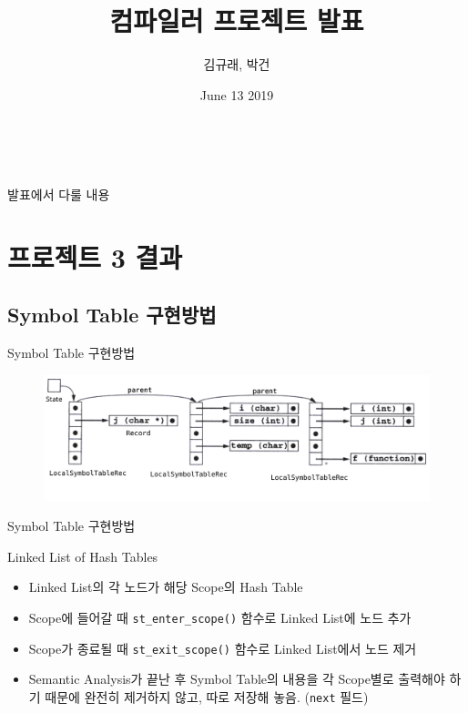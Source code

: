 \documentclass{bredelebeamer}
\title[Compiler Project]{컴파일러 프로젝트 발표}
\subtitle{}
\author{김규래, 박건}
\institute[Sogang University]
{
  서강대학교\\
}
\date{June 13 2019}
\def\code#1{\texttt{#1}}
\begin{document}
\begin{frame}
  \titlepage\
\end{frame}

\begin{frame}{발표에서 다룰 내용}
  \tableofcontents %
\end{frame}

\section{프로젝트 3 결과}
\subsection{Symbol Table 구현방법}
\begin{frame}{Symbol Table 구현방법}
	\begin{figure}
		\includegraphics[scale=0.3]{images/symtab.png}
	\end{figure}
\end{frame}

\begin{frame}{Symbol Table 구현방법}
	\begin{block}{Linked List of Hash Tables}
		\begin{itemize}
			\item Linked List의 각 노드가 해당 Scope의 Hash Table
			\item Scope에 들어갈 때 \code{st\_enter\_scope()} 함수로 Linked List에 노드 추가
			\item Scope가 종료될 때 \code{st\_exit\_scope()} 함수로 Linked List에서 노드 제거
			\item Semantic Analysis가 끝난 후 Symbol Table의 내용을 각 Scope별로 출력해야 하기 때문에 완전히 제거하지 않고, 따로 저장해 놓음. (\code{next} 필드)
		\end{itemize}
	\end{block}
\end{frame}
\end{document}
